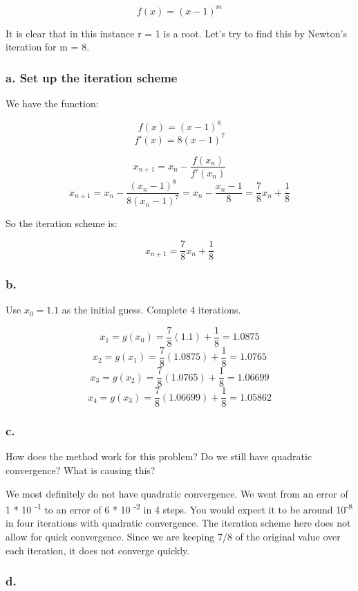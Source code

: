 \documentclass[]{article}
\begin{document}
\[f(x) = (x-1)^m\]

It is clear that in this instance r = 1 is a root. Let's try to find
this by Newton's iteration for m = 8.

\hypertarget{a.-set-up-the-iteration-scheme}{%
\subsubsection{a. Set up the iteration
scheme}\label{a.-set-up-the-iteration-scheme}}

We have the function:

\[f(x) = (x-1)^8\] \[f'(x) = 8(x-1)^7\]

\[x_{n+1} = x_n-\frac{f(x_n)}{f'(x_n)}\]
\[x_{n+1} = x_n-\frac{(x_n-1)^8}{8(x_n-1)^7}=x_n-\frac{x_n-1}{8}=\frac78x_n+\frac18\]

So the iteration scheme is:

\[x_{n+1} = \frac78x_n+\frac18\]

\hypertarget{b.}{%
\subsubsection{b.}\label{b.}}

Use \(x_0 = 1.1\) as the initial guess. Complete 4 iterations.

\[x_1 = g(x_0) = \frac78(1.1)+\frac18 = 1.0875\]
\[x_2 = g(x_1) = \frac78(1.0875)+\frac18 = 1.0765\]
\[x_3 = g(x_2) = \frac78(1.0765)+\frac18 = 1.06699\]
\[x_4 = g(x_3) = \frac78(1.06699)+\frac18 =  1.05862\]

\hypertarget{c.}{%
\subsubsection{c.}\label{c.}}

How does the method work for this problem? Do we still have quadratic
convergence? What is causing this?

We most definitely do not have quadratic convergence. We went from an
error of 1 * 10 \textsuperscript{-1} to an error of 6 * 10
\textsuperscript{-2} in 4 steps. You would expect it to be around
10\textsuperscript{-8} in four iterations with quadratic convergence.
The iteration scheme here does not allow for quick convergence. Since we
are keeping 7/8 of the original value over each iteration, it does not
converge quickly.

\hypertarget{d.}{%
\subsubsection{d.}\label{d.}}
\end{document}
